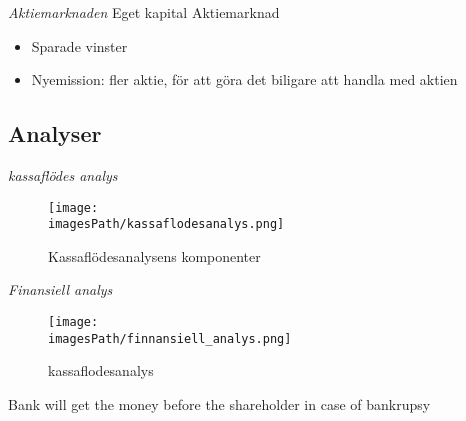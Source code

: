 \textit{Aktiemarknaden} \newline
Eget kapital Aktiemarknad
\begin{itemize}
    \item Sparade vinster 
    \item Nyemission: fler aktie, för att göra det biligare att handla med aktien
\end{itemize}

\subsection{Analyser}
\textit{kassaflödes analys}
\begin{figure}[!h]
    \centering
    \texttt{[image: \\imagesPath/kassaflodesanalys.png]}
    \caption{Kassaflödesanalysens komponenter}
\end{figure}

\textit{Finansiell analys}
\begin{figure}[!h]
    \centering
    \texttt{[image: \\imagesPath/finnansiell\_analys.png]}
    \caption{kassaflodesanalys}
\end{figure}

Bank will get the money before the shareholder in case of bankrupsy
